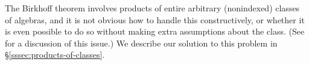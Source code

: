 The Birkhoff theorem involves products of entire arbitrary (nonindexed) classes of algebras, and it is not obvious how to handle this constructively, or whether it is even possible to do so without making extra assumptions about the class. (See~\cite{Carlstrom:2008} for a discussion of this issue.)  We describe our solution to this problem in \S\ref{sssec:products-of-classes}.


